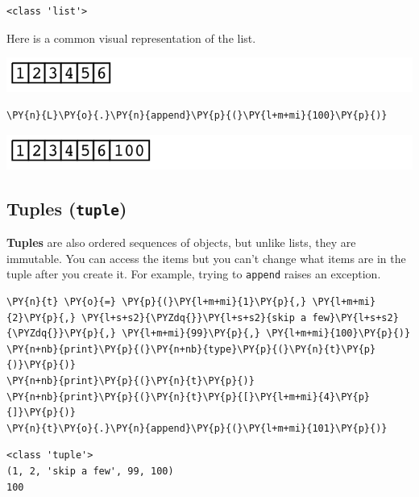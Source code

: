 \begin{Verbatim}
<class 'list'>

\end{Verbatim}


Here is a common visual representation of the list.


\includegraphics[width=\textwidth]{./figures/list_example01.png}

\begin{Verbatim}[commandchars=\\\{\}]
\PY{n}{L}\PY{o}{.}\PY{n}{append}\PY{p}{(}\PY{l+m+mi}{100}\PY{p}{)}
\end{Verbatim}



\includegraphics[width=\textwidth]{./figures/list_example02.png}

\subsection{Tuples (\texttt{tuple})}


\textbf{Tuples} are also ordered sequences of objects, but unlike lists, they are immutable.  You can access the items but you can’t change what items are in the tuple after you create it.  For example, trying to \texttt{append} raises an exception.


\begin{Verbatim}[commandchars=\\\{\}]
\PY{n}{t} \PY{o}{=} \PY{p}{(}\PY{l+m+mi}{1}\PY{p}{,} \PY{l+m+mi}{2}\PY{p}{,} \PY{l+s+s2}{\PYZdq{}}\PY{l+s+s2}{skip a few}\PY{l+s+s2}{\PYZdq{}}\PY{p}{,} \PY{l+m+mi}{99}\PY{p}{,} \PY{l+m+mi}{100}\PY{p}{)}
\PY{n+nb}{print}\PY{p}{(}\PY{n+nb}{type}\PY{p}{(}\PY{n}{t}\PY{p}{)}\PY{p}{)}
\PY{n+nb}{print}\PY{p}{(}\PY{n}{t}\PY{p}{)}
\PY{n+nb}{print}\PY{p}{(}\PY{n}{t}\PY{p}{[}\PY{l+m+mi}{4}\PY{p}{]}\PY{p}{)}
\PY{n}{t}\PY{o}{.}\PY{n}{append}\PY{p}{(}\PY{l+m+mi}{101}\PY{p}{)}
\end{Verbatim}

\begin{Verbatim}
<class 'tuple'>
(1, 2, 'skip a few', 99, 100)
100

\end{Verbatim}

